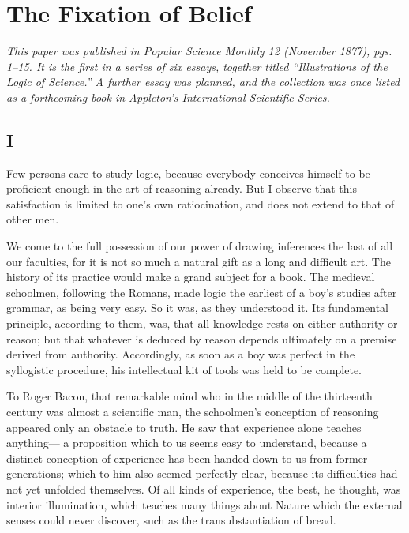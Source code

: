 
\section*{The Fixation of Belief}
\emph{This paper was published in \emph{Popular Science Monthly} 12 (November 1877), pgs. 1--15. It is the first in a series of six essays, together titled ``Illustrations of the Logic of Science.'' A further essay was planned, and the collection was once listed as a forthcoming book in Appleton's International Scientific Series.}

\subsection*{I}


Few persons care to study logic, because everybody conceives himself to be proficient enough in the art of reasoning already. But I observe that this satisfaction is limited to one's own ratiocination, and does not extend to that of other men.

We come to the full possession of our power of drawing inferences the last of all our faculties, for it is not so much a natural gift as a long and difficult art. The history of its practice would make a grand subject for a book. The medieval schoolmen, following the Romans, made logic the earliest of a boy's studies after grammar, as being very easy. So it was, as they understood it. Its fundamental principle, according to them, was, that all knowledge rests on either authority or reason; but that whatever is deduced by reason depends ultimately on a premise derived from authority. Accordingly, as soon as a boy was perfect in the syllogistic procedure, his intellectual kit of tools was held to be complete.

To Roger Bacon, that remarkable mind who in the middle of the thirteenth century was almost a scientific man, the schoolmen's conception of reasoning appeared only an obstacle to truth. He saw that experience alone teaches anything--- a proposition which to us seems easy to understand, because a distinct conception of experience has been handed down to us from former generations; which to him also seemed perfectly clear, because its difficulties had not yet unfolded themselves. Of all kinds of experience, the best, he thought, was interior illumination, which teaches many things about Nature which the external senses could never discover, such as the transubstantiation of bread.

